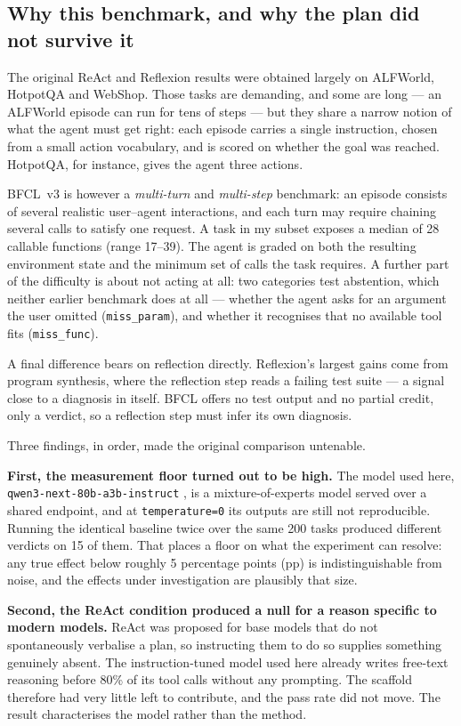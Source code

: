 \documentclass[a4paper, 12pt]{article}
\begin{document}
\subsection{Why this benchmark, and why the plan did not survive it}

The original ReAct and Reflexion results were obtained largely on ALFWorld,
HotpotQA and WebShop. Those tasks are demanding, and some are long — an ALFWorld
episode can run for tens of steps — but they share a narrow notion of what the agent
must get right: each episode carries a single instruction, chosen from a small action vocabulary,
and is scored on whether the goal was reached. HotpotQA, for instance, gives the agent three actions.

BFCL~v3 \cite{patil2025bfcl} is however a \emph{multi-turn} and \emph{multi-step} benchmark: an episode
consists of several realistic user–agent interactions, and each turn may require chaining several calls
to satisfy one request. A task in my subset exposes a median of 28 callable functions (range 17--39).
The agent is graded on both the resulting environment state and the minimum set of calls the task requires.
A further part of the difficulty is about not acting at all: two categories test abstention,
which neither earlier benchmark does at all — whether the agent asks for an argument
the user omitted (\texttt{miss\_param}), and whether it recognises that no available tool fits (\texttt{miss\_func}).

A final difference bears on reflection directly. Reflexion's largest gains come from program synthesis,
where the reflection step reads a failing test suite — a signal close to a diagnosis in itself.
BFCL offers no test output and no partial credit, only a verdict, so a reflection step must infer its own diagnosis.

Three findings, in order, made the original comparison untenable.

\textbf{First, the measurement floor turned out to be high.} The model used here,
\texttt{qwen3-next-80b-a3b-instruct} \cite{qwen3}, is a mixture-of-experts model
served over a shared endpoint, and at \texttt{temperature=0} its outputs are still
not reproducible. Running the identical baseline twice over the same 200 tasks produced
different verdicts on 15 of them. That places a floor on what the experiment can resolve: any true
effect below roughly 5 percentage points (pp) is indistinguishable from noise,
and the effects under investigation are plausibly that size.

\textbf{Second, the ReAct condition produced a null for a reason specific to
modern models.} ReAct was proposed for base models that do not spontaneously
verbalise a plan, so instructing them to do so supplies something genuinely
absent. The instruction-tuned model used here already writes free-text reasoning
before 80\% of its tool calls without any prompting. The scaffold therefore had
very little left to contribute, and the pass rate did not move. The result
characterises the model rather than the method.
\end{document}

